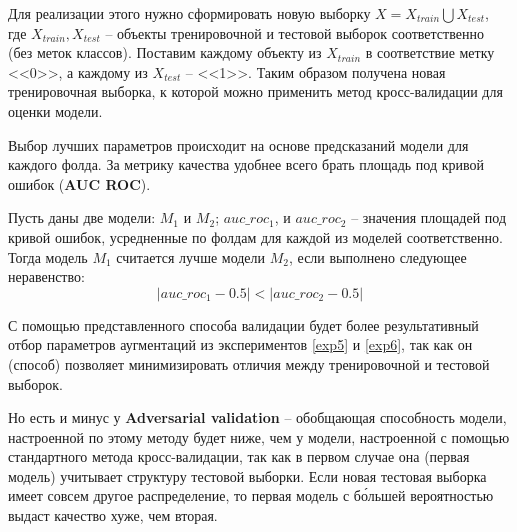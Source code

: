 \documentclass[a4paper, 11pt]{article}
\begin{document}
        Для реализации этого нужно сформировать новую выборку $X = X_{train} \bigcup X_{test}$, где $X_{train}, X_{test}$ -- объекты тренировочной и тестовой выборок соответственно (без меток классов). Поставим каждому объекту из $X_{train}$ в соответствие метку <<0>>, а каждому из $X_{test}$ -- <<1>>. Таким образом получена новая тренировочная выборка, к которой можно применить метод кросс-валидации для оценки модели.
        
        Выбор лучших параметров происходит на основе предсказаний модели для каждого фолда. За метрику качества удобнее всего брать площадь под кривой ошибок (\textbf{AUC ROC}). 
        
        Пусть даны две модели: $M_{1}$ и $M_{2}$; $auc\_roc_{1}$, и $auc\_roc_{2}$ -- значения площадей под кривой ошибок, усредненные по фолдам для каждой из моделей соответственно. Тогда модель $M_{1}$ считается лучше модели $M_{2}$, если выполнено следующее неравенство:
        \[|auc\_roc_{1} - 0.5| < |auc\_roc_{2} - 0.5|\]
        
        С помощью представленного способа валидации будет более результативный отбор параметров аугментаций из экспериментов \ref{exp5} и \ref{exp6}, так как он (способ) позволяет минимизировать отличия между тренировочной и тестовой выборок. 
        
        Но есть и минус у \textbf{Adversarial validation} -- обобщающая способность модели, настроенной по этому методу будет ниже, чем у модели, настроенной с помощью стандартного метода кросс-валидации, так как в первом случае она (первая модель) учитывает структуру тестовой выборки. Если новая тестовая выборка имеет совсем другое распределение, то первая модель с б\'{о}льшей вероятностью выдаст качество хуже, чем вторая.
\end{document}
